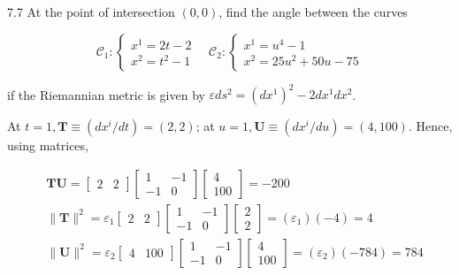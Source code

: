 \documentclass[10pt]{article}
\begin{document}
7.7 At the point of intersection $(0,0)$, find the angle between the curves

$$
\mathscr{C}_{1}:\left\{\begin{array}{l}
x^{1}=2 t-2 \\
x^{2}=t^{2}-1
\end{array} \quad \mathscr{C}_{2}:\left\{\begin{array}{l}
x^{1}=u^{4}-1 \\
x^{2}=25 u^{2}+50 u-75
\end{array}\right.\right.
$$

if the Riemannian metric is given by $\varepsilon d s^{2}=\left(d x^{1}\right)^{2}-2 d x^{1} d x^{2}$.

At $t=1, \mathbf{T} \equiv\left(d x^{i} / d t\right)=(2,2)$; at $u=1, \mathbf{U} \equiv\left(d x^{i} / d u\right)=(4,100)$. Hence, using matrices,

$$
\begin{aligned}
& \mathbf{T U}=\left[\begin{array}{ll}
2 & 2
\end{array}\right]\left[\begin{array}{rr}
1 & -1 \\
-1 & 0
\end{array}\right]\left[\begin{array}{c}
4 \\
100
\end{array}\right]=-200 \\
& \|\mathbf{T}\|^{2}=\varepsilon_{1}\left[\begin{array}{ll}
2 & 2
\end{array}\right]\left[\begin{array}{rr}
1 & -1 \\
-1 & 0
\end{array}\right]\left[\begin{array}{l}
2 \\
2
\end{array}\right]=\left(\varepsilon_{1}\right)(-4)=4 \\
& \|\mathbf{U}\|^{2}=\varepsilon_{2}\left[\begin{array}{ll}
4 & 100
\end{array}\right]\left[\begin{array}{rr}
1 & -1 \\
-1 & 0
\end{array}\right]\left[\begin{array}{c}
4 \\
100
\end{array}\right]=\left(\varepsilon_{2}\right)(-784)=784
\end{aligned}
$$
\end{document}
